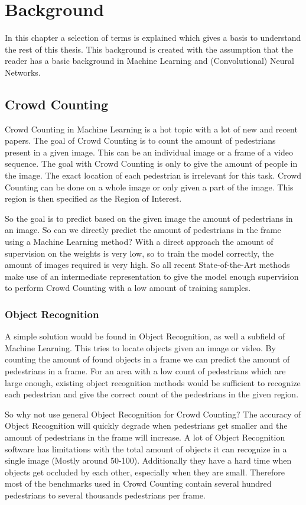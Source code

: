 \chapter{Background}
In this chapter a selection of terms is explained which gives a basis to understand the rest of this thesis. This background is created with the assumption that the reader has a basic background in Machine Learning and (Convolutional) Neural Networks.

\section{Crowd Counting}
Crowd Counting in Machine Learning is a hot topic with a lot of new and recent papers. The goal of Crowd Counting is to count the amount of pedestrians present in a given image. This can be an individual image or a frame of a video sequence. The goal with Crowd Counting is only to give the amount of people in the image. The exact location of each pedestrian is irrelevant for this task. Crowd Counting can be done on a whole image or only given a part of the image. This region is then specified as the Region of Interest.

So the goal is to predict based on the given image the amount of pedestrians in an image. So can we directly predict the amount of pedestrians in the frame using a Machine Learning method? With a direct approach the amount of supervision on the weights is very low, so to train the model correctly, the amount of images required is very high. So all recent State-of-the-Art methods make use of an intermediate representation to give the model enough supervision to perform Crowd Counting with a low amount of training samples.

\subsection{Object Recognition}
A simple solution would be found in Object Recognition, as well a subfield of Machine Learning. This tries to locate objects given an image or video. By counting the amount of found objects in a frame we can predict the amount of pedestrians in a frame. For an area with a low count of pedestrians which are large enough, existing object recognition methods would be sufficient to recognize each pedestrian and give the correct count of the pedestrians in the given region.

So why not use general Object Recognition for Crowd Counting? The accuracy of Object Recognition will quickly degrade when pedestrians get smaller and the amount of pedestrians in the frame will increase. A lot of Object Recognition software has limitations with the total amount of objects it can recognize in a single image (Mostly around 50-100). Additionally they have a hard time when objects get occluded by each other, especially when they are small.
Therefore most of the benchmarks used in Crowd Counting contain several hundred pedestrians to several thousands pedestrians per frame.

